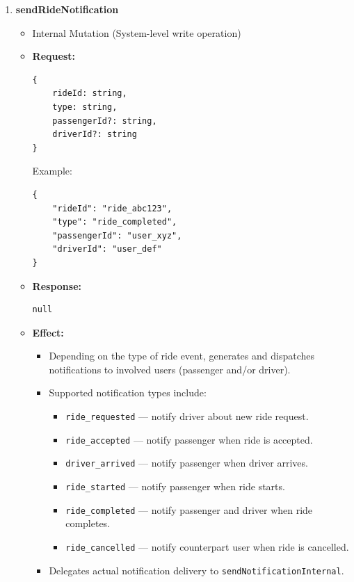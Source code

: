 \documentclass[a4paper,12pt]{article}
\begin{document}
\begin{enumerate}
    \item \textbf{sendRideNotification}
    \begin{itemize}
        \item Internal Mutation (System-level write operation)
        \item \textbf{Request:}
        \begin{verbatim}
{
    rideId: string,
    type: string,
    passengerId?: string,
    driverId?: string
}
        \end{verbatim}
        Example:
        \begin{verbatim}
{
    "rideId": "ride_abc123",
    "type": "ride_completed",
    "passengerId": "user_xyz",
    "driverId": "user_def"
}
        \end{verbatim}
        \item \textbf{Response:}
        \begin{verbatim}
null
        \end{verbatim}
        \item \textbf{Effect:}
        \begin{itemize}
            \item Depending on the type of ride event, generates and dispatches notifications to involved users (passenger and/or driver).
            \item Supported notification types include:
            \begin{itemize}
                \item \texttt{ride\_requested} — notify driver about new ride request.
                \item \texttt{ride\_accepted} — notify passenger when ride is accepted.
                \item \texttt{driver\_arrived} — notify passenger when driver arrives.
                \item \texttt{ride\_started} — notify passenger when ride starts.
                \item \texttt{ride\_completed} — notify passenger and driver when ride completes.
                \item \texttt{ride\_cancelled} — notify counterpart user when ride is cancelled.
            \end{itemize}
            \item Delegates actual notification delivery to \texttt{sendNotificationInternal}.
        \end{itemize}
    \end{itemize}


\end{enumerate}
\end{document}

